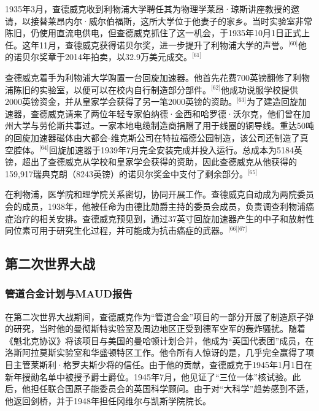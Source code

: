 1935年3月，查德威克收到利物浦大学聘任其为物理学莱昂·琼斯讲座教授的邀请，以接替莱昂内尔·威尔伯福斯，这所大学位于他妻子的家乡。当时实验室非常陈旧，仍使用直流电供电，但查德威克抓住了这一机会，于1935年10月1日正式上任。这年11月，查德威克获得诺贝尔奖，进一步提升了利物浦大学的声誉。\(^\text{[60]}\)他的诺贝尔奖章于2014年拍卖，以32.9万美元成交。\(^\text{[61]}\)

查德威克着手为利物浦大学购置一台回旋加速器。他首先花费700英镑翻修了利物浦陈旧的实验室，以便可以在校内自行制造部分部件。\(^\text{[62]}\)他成功说服学校提供2000英镑资金，并从皇家学会获得了另一笔2000英镑的资助。\(^\text{[63]}\)为了建造回旋加速器，查德威克请来了两位年轻专家伯纳德·金西和哈罗德·沃尔克，他们曾在加州大学与劳伦斯共事过。一家本地电缆制造商捐赠了用于线圈的铜导线。重达50吨的回旋加速器磁体由大都会-维克斯公司在特拉福德公园制造，该公司还制造了真空腔体。\(^\text{[64]}\)回旋加速器于1939年7月完全安装完成并投入运行。总成本为5184英镑，超出了查德威克从学校和皇家学会获得的资助，因此查德威克从他获得的159,917瑞典克朗（8243英镑）的诺贝尔奖金中支付了剩余部分。\(^\text{[65]}\)

在利物浦，医学院和理学院关系密切，协同开展工作。查德威克自动成为两院委员会的成员，1938年，他被任命为由德比勋爵主持的委员会成员，负责调查利物浦癌症治疗的相关安排。查德威克预见到，通过37英寸回旋加速器产生的中子和放射性同位素可用于研究生化过程，并可能成为抗击癌症的武器。\(^\text{[66][67]}\)
\subsection{第二次世界大战}
\subsubsection{管道合金计划与MAUD报告}
在第二次世界大战期间，查德威克作为“管道合金”项目的一部分开展了制造原子弹的研究，当时他的曼彻斯特实验室及周边地区正受到德军空军的轰炸骚扰。随着《魁北克协议》将该项目与美国的曼哈顿计划合并，他成为“英国代表团”成员，在洛斯阿拉莫斯实验室和华盛顿特区工作。他令所有人惊讶的是，几乎完全赢得了项目主管莱斯利·格罗夫斯少将的信任。由于他的贡献，查德威克于1945年1月1日在新年授勋名单中被授予爵士爵位。1945年7月，他见证了“三位一体”核试验。此后，他担任联合国原子能委员会的英国科学顾问。由于对“大科学”趋势感到不适，他返回剑桥，并于1948年担任冈维尔与凯斯学院院长。

